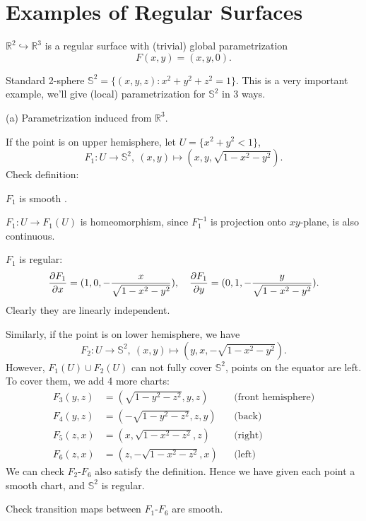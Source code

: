 \section{Examples of Regular Surfaces}

\begin{example}[1]
    \(\mathbb{R}^2\hookrightarrow\mathbb{R}^3\) is a regular surface with (trivial)
    global parametrization \[
        F(x,y)=(x,y,0)
    .\] 
\end{example}

\begin{example}[2]
    \label{charts on unit sphere}
    Standard 2-sphere \(\mathbb{S}^2=\{(x,y,z):x^2+y^2+z^2=1\}\). This is a very
    important example, we'll give (local) parametrization for \(\mathbb{S}^2\)
    in 3 ways.
\end{example}
\noindent (a) Parametrization induced from \(\mathbb{R}^3\).

If the point is on upper hemisphere, let \(U=\{x^2+y^2<1\}\), \[
    F_1\colon U\to \mathbb{S}^2,\ (x,y)\mapsto (x,y,\sqrt{1-x^2-y^2}).
\] Check definition:

\(F_1\) is smooth \checkmark{}. 

\(F_1\colon U\to F_1(U)\) is homeomorphism, since \(F_1^{-1}\) is
projection onto \(xy\)-plane, is also continuous.

\(F_1\) is regular: \[
    \pdv{F_1}{x}=(1,0,-\frac{x}{\sqrt{1-x^2-y^2}}),\quad
    \pdv{F_1}{y}=(0,1,-\frac{y}{\sqrt{1-x^2-y^2}})
.\] Clearly they are linearly independent.

Similarly, if the point is on lower hemisphere, we have \[
    F_2\colon U\to \mathbb{S}^2,\ (x,y)\mapsto (y,x,-\sqrt{1-x^2-y^2})
.\] However, \(F_1(U)\cup F_2(U)\) can not fully cover \(\mathbb{S}^2\), points on
the equator are left. To cover them, we add 4 more charts:
\begin{align*}
    F_3(y,z)&= (\sqrt{1-y^2-z^2},y,z) &&\text{(front hemisphere)} \\
    F_4(y,z)&= (-\sqrt{1-y^2-z^2},z,y) &&\text{(back)} \\
    F_5(z,x)&= (x,\sqrt{1-x^2-z^2},z) &&\text{(right)} \\
    F_6(z,x)&= (z,-\sqrt{1-x^2-z^2},x) &&\text{(left)}
\end{align*}
We can check \(F_2\)-\(F_6\) also satisfy the definition. Hence we have given each
point a smooth chart, and \(\mathbb{S}^2\) is regular.
\begin{exercise}
    Check transition maps between \(F_1\)-\(F_6\) are smooth.
\end{exercise}

